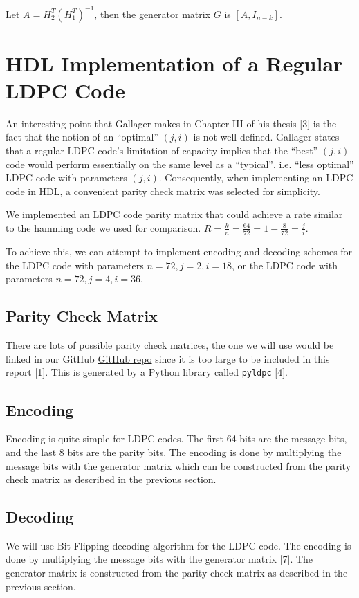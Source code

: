 \documentclass[conference]{IEEEtran}
\begin{document}
    Let $A = H_2^T(H_1^T)^{-1}$, then the generator matrix $G$ is $[A, I_{n-k}]$.

\section{HDL Implementation of a Regular LDPC Code}
An interesting point that Gallager makes in Chapter III of his thesis [3] is the fact that the notion of an ``optimal'' $(j,i)$ is not well defined.
Gallager states that a regular LDPC code's limitation of capacity implies that the ``best'' $(j,i)$ code would perform essentially on the same level as a ``typical'', i.e. ``less optimal'' LDPC code with parameters $(j,i)$.
Consequently, when implementing an LDPC code in HDL, a convenient parity check matrix was selected for simplicity.

We implemented an LDPC code parity matrix that could achieve a rate similar to
the hamming code we used for comparison.
$R=\frac{k}{n}=\frac{64}{72}=1-\frac{8}{72} = \frac{j}{i}$.

To achieve this, we can attempt to implement encoding and decoding schemes for
the LDPC code with parameters $n=72, j=2, i=18$, or the LDPC code with
parameters $n=72, j=4, i=36$.
\subsection{Parity Check Matrix}
There are lots of possible parity check matrices, the one we will use would be linked in our GitHub \href{https://hichamjanati.github.io/pyldpc/}{GitHub repo} since it is too large to be included in this report [1]. This is generated by a Python library called \href{https://hichamjanati.github.io/pyldpc/}{\texttt{pyldpc}} [4].
\subsection{Encoding}
Encoding is quite simple for LDPC codes. The first 64 bits are the message bits, and the last 8 bits are the parity bits. The encoding is done by multiplying the message bits with the generator matrix which can be constructed from the parity check matrix as described in the previous section.
\subsection{Decoding}
We will use Bit-Flipping decoding algorithm for the LDPC code. The encoding is done by multiplying the message bits with the generator matrix [7]. The generator matrix is constructed from the parity check matrix as described in the previous section.
\end{document}
